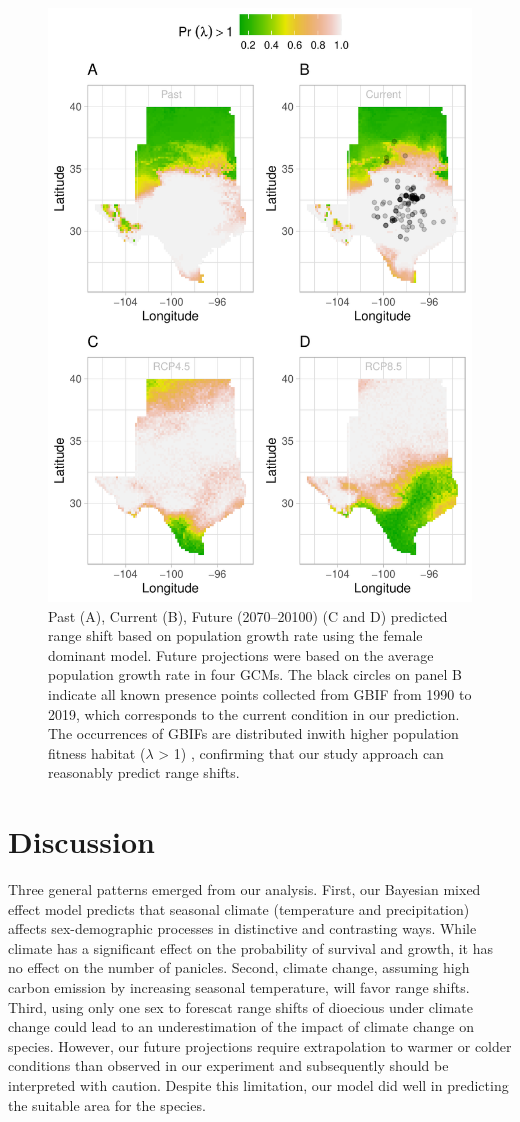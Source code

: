 \documentclass[12pt]{article}
\begin{document}
\begin{figure}%
  \begin{center}
    \includegraphics[width=0.78\linewidth]{Figures/Fig_geoPrlambdaprojection_fd_miroc.pdf}
  \caption{Past (A), Current (B), Future (2070–20100) (C and D) predicted range shift based on population growth rate using the female dominant model. Future projections were based on the average population growth rate in four GCMs. The black circles on panel B indicate all known presence points collected from GBIF from 1990 to 2019, which corresponds to the current condition in our prediction.  The occurrences of GBIFs are distributed inwith higher population fitness habitat ($\lambda$ > 1) , confirming that our study approach can reasonably predict range shifts. }
  \label{fig:geoproj}
  \end{center}
\end{figure}

\section*{Discussion}
Three general patterns emerged from our analysis. First, our Bayesian mixed effect model predicts that seasonal climate (temperature and precipitation) affects sex-demographic processes in distinctive and contrasting ways.
While climate has a significant effect on the probability of survival and growth, it has no effect on the number of panicles. Second, climate change, assuming high carbon emission by increasing seasonal temperature, will favor range shifts. 
Third, using only one sex to forescat range shifts of dioecious under climate change could lead to an underestimation of the impact of  climate change on species.
However, our future projections require extrapolation to warmer or colder conditions than observed in our experiment and subsequently should be interpreted with caution. 
Despite this limitation, our model did well in predicting the suitable area for the species. 
\end{document}
